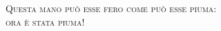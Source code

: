 \thispagestyle{empty}
\begin{center}
\large\textsc{Questa mano può esse fero come può esse piuma:\\ \LARGE ora è stata piuma!}
\end{center}